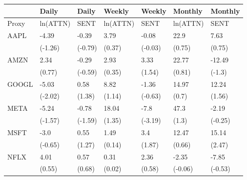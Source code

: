 \begin{tabular}{lllllll}
\toprule
{} &     Daily &    Daily &    Weekly &   Weekly &   Monthly &  Monthly \\
\midrule
Proxy &  ln(ATTN) &     SENT &  ln(ATTN) &     SENT &  ln(ATTN) &     SENT \\
AAPL  &     -4.39 &    -0.39 &      3.79 &    -0.08 &      22.9 &     7.63 \\
      &   (-1.26) &  (-0.79) &    (0.37) &  (-0.03) &    (0.75) &   (0.75) \\
AMZN  &      2.34 &    -0.29 &      2.93 &     3.33 &     22.77 &   -12.49 \\
      &    (0.77) &  (-0.59) &    (0.35) &   (1.54) &    (0.81) &   (-1.3) \\
GOOGL &     -5.03 &     0.58 &      8.82 &    -1.36 &     14.97 &    12.24 \\
      &   (-2.02) &   (1.38) &    (1.14) &  (-0.63) &     (0.7) &   (1.56) \\
META  &     -5.24 &    -0.78 &     18.04 &     -7.8 &      47.3 &    -2.19 \\
      &   (-1.57) &  (-1.59) &    (1.35) &  (-3.19) &     (1.3) &  (-0.25) \\
MSFT  &      -3.0 &     0.55 &      1.49 &      3.4 &     12.47 &    15.14 \\
      &   (-0.65) &   (1.27) &    (0.14) &   (1.87) &    (0.66) &   (2.47) \\
NFLX  &      4.01 &     0.57 &      0.31 &     2.36 &     -2.35 &    -7.85 \\
      &    (0.55) &   (0.68) &    (0.02) &   (0.58) &   (-0.06) &  (-0.53) \\
\bottomrule
\end{tabular}
